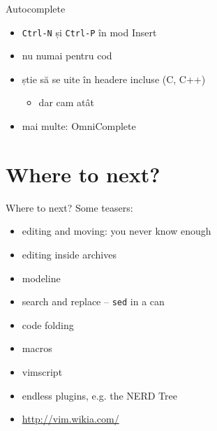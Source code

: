 \documentclass{beamer}
\begin{document}
\begin{frame}{Autocomplete}
  \begin{itemize}
    \item \texttt{Ctrl-N} și \texttt{Ctrl-P} în mod Insert
    \item nu numai pentru cod
    \item știe să se uite în headere incluse (C, C++)
    \pause
      \begin{itemize}
	\item dar cam atât
      \end{itemize}
    \pause
    \item mai multe: OmniComplete
  \end{itemize}
\end{frame}

\section{Where to next?}
\begin{frame}{Where to next?}
  Some teasers:
  \begin{itemize}
    \item editing and moving: you never know enough
    \item editing inside archives
    \item modeline
    \item search and replace -- \texttt{sed} in a can
    \item code folding
    \item macros
    \item vimscript
    \item endless plugins, e.g. the NERD Tree
    \item \url{http://vim.wikia.com/}
  \end{itemize}
\end{frame}
\end{document}
